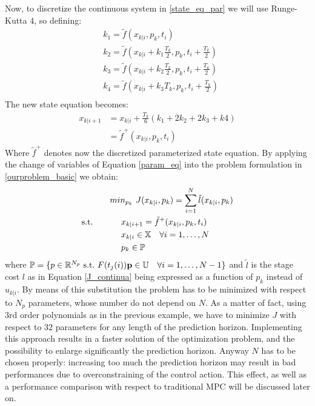 Now, to discretize the continuous system in \ref{state_eq_par} we will use Runge-Kutta 4, so defining: 
\begin{equation*}
\begin{split}
    &k_1 = \tilde{f}(x_{k|i},p_k,t_i) \\
	&k_2 = \tilde{f}(x_{k|i}+k_1\frac{T_k}{2},p_k,t_i+\frac{T_k}{2}) \\
	&k_3 = \tilde{f}(x_{k|i}+k_2\frac{T_k}{2},p_k,t_i+\frac{T_k}{2})\\
	&k_4 = \tilde{f}(x_{k|i}+k_3T_k,p_k,t_i+\frac{T_k}{2})\\
\end{split}	
\end{equation*}
The new state equation becomes:  
\begin{equation}\label{state_eq_param}
\begin{split}
	x_{k|i+1}&=x_{k|i}+\frac{T_k}{6}(k_1+2k_2+2k_3+k4) \\
	&=\tilde{f}^+(x_{k|i},p_k,t_i)
\end{split}
\end{equation}
Where $\tilde{f}^+$ denotes now the discretized parameterized state equation.
By applying the change of variables of Equation \ref{param_eq} into the problem formulation in \ref{ourproblem_basic} we obtain:
\begin{equation} \label{ourproblem_param}
\begin{split}
		& min_{p_k}\ J({x}_{k|i},p_k) = \sum_{i=1}^{N}\tilde{l}({x}_{k|i},p_k) \\
		\textnormal{s.t.}\qquad
		&\ \ \ \ x_{k|i+1}=\tilde{f}^+(x_{k|i},p_k,t_i) \\
		&\ \ \ \ {x}_{k|i} \in \mathbb{X}\quad \forall i=1,\dots, N  \\
		&\ \ \ \ p_k   \in \mathbb{P}\ \\
	\end{split}	
\end{equation}
where $\mathbb{P} = \lbrace p\in \mathbb{R}^{N_p}\ \textnormal{s.t.}\ F(t_j(i))\textbf{p} \in \mathbb{U}\quad \forall i = 1, \dots, N-1 \rbrace $ and $\tilde{l}$ is the stage cost $l$ as in Equation \ref{J_continua} being expressed as a function of $p_k$ instead of ${u}_{k|i}$. By means of this substitution the problem has to be minimized with respect to $N_p$ parameters, whose number do not depend on $N$. As a matter of fact, using 3rd order polynomials as in the previous example, we have to minimize $J$ with respect to $32$ parameters for any length of the prediction horizon. Implementing this approach results in a faster solution of the optimization problem, and the possibility to enlarge significantly the prediction horizon. Anyway $N$ has to be chosen properly: increasing too much the prediction horizon may result in bad performances due to overconstraining of the control action. This effect, as well as a performance comparison with respect to traditional MPC will be discussed later on.
